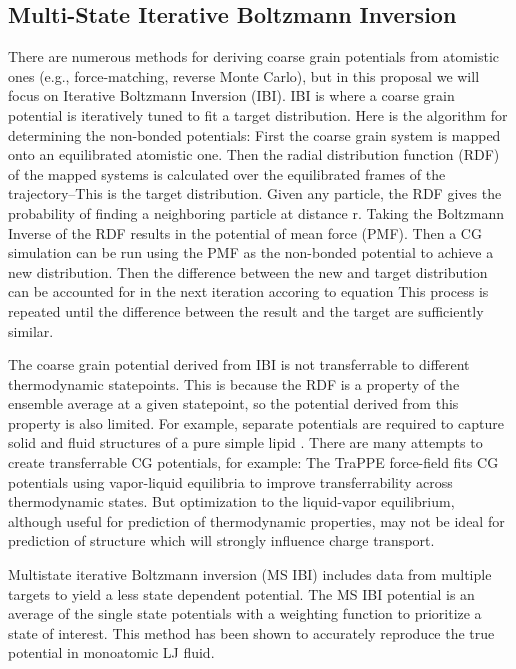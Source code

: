 \subsection*{Multi-State Iterative Boltzmann Inversion}

There are numerous methods for deriving coarse grain potentials from atomistic ones (e.g., force-matching, reverse Monte Carlo), but in this proposal we will focus on Iterative Boltzmann Inversion (IBI).
IBI is where a coarse grain potential is iteratively tuned to fit a target distribution\cite{Reith2003}.
Here is the algorithm for determining the non-bonded potentials:
First the coarse grain system is mapped onto an equilibrated atomistic one.
Then the radial distribution function (RDF) of the mapped systems is calculated over the equilibrated frames of the trajectory--This is the target distribution.
Given any particle, the RDF gives the probability of finding a neighboring particle at distance r.
Taking the Boltzmann Inverse of the RDF results in the potential of mean force (PMF). %
Then a CG simulation can be run using the PMF as the non-bonded potential to achieve a new distribution.
Then the difference between the new and target distribution can be accounted for in the next iteration accoring to equation %
This process is repeated until the difference between the result and the target are sufficiently similar.

The coarse grain potential derived from IBI is not transferrable to different thermodynamic statepoints.
This is because the RDF is a property of the ensemble average at a given statepoint, so the potential derived from this property is also limited.
For example, separate potentials are required to capture solid and fluid structures of a pure simple lipid \cite{Hadley2010a}.
There are many attempts to create transferrable CG potentials, for example:
The TraPPE force-field fits CG potentials using vapor-liquid equilibria to improve transferrability across thermodynamic states\cite{Maerzke2011}.
But optimization to the liquid-vapor equilibrium, although useful for prediction of thermodynamic properties, may not be ideal for prediction of structure which will strongly influence charge transport.

Multistate iterative Boltzmann inversion (MS IBI) includes data from multiple targets to yield a less state dependent potential\cite{Moore2014}.
The MS IBI potential is an average of the single state potentials with a weighting function to prioritize a state of interest.
This method has been shown to accurately reproduce the true potential in monoatomic LJ fluid.

